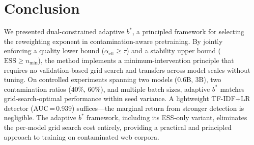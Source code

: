 \documentclass[11pt,a4paper]{article}
\newcommand{\bstar}{b^{*}}
\newcommand{\aeff}{\alpha_{\mathrm{eff}}}
\newcommand{\nmin}{n_{\min}}
\begin{document}
\section{Conclusion}
\label{sec:conclusion}

We presented dual-constrained adaptive $\bstar$, a principled framework for selecting the reweighting exponent in contamination-aware pretraining.
By jointly enforcing a quality lower bound ($\aeff\geq\tau$) and a stability upper bound ($\mathrm{ESS}\geq\nmin$), the method implements a minimum-intervention principle that requires no validation-based grid search and transfers across model scales without tuning.
On controlled experiments spanning two models (0.6B, 3B), two contamination ratios (40\%, 60\%), and multiple batch sizes, adaptive $\bstar$ matches grid-search-optimal performance within seed variance.
A lightweight TF-IDF+LR detector (AUC\,=\,0.939) suffices---the marginal return from stronger detection is negligible.
The adaptive $\bstar$ framework, including its ESS-only variant, eliminates the per-model grid search cost entirely, providing a practical and principled approach to training on contaminated web corpora.
\end{document}
